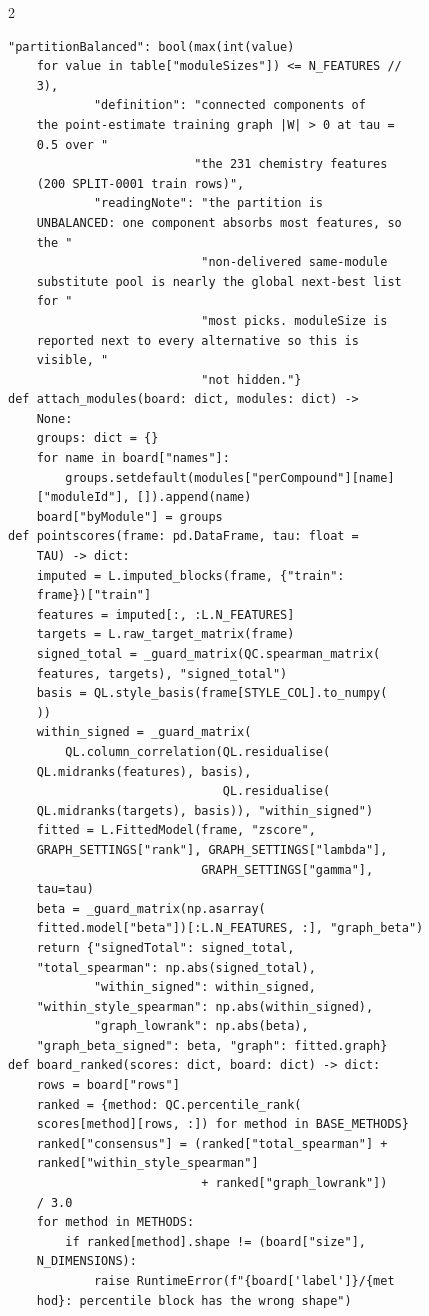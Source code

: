 \begin{multicols}{2}
\begin{Verbatim}[fontsize=\scriptsize]
            "partitionBalanced": bool(max(int(value)
    for value in table["moduleSizes"]) <= N_FEATURES //
    3),
            "definition": "connected components of
    the point-estimate training graph |W| > 0 at tau =
    0.5 over "
                          "the 231 chemistry features
    (200 SPLIT-0001 train rows)",
            "readingNote": "the partition is
    UNBALANCED: one component absorbs most features, so
    the "
                           "non-delivered same-module
    substitute pool is nearly the global next-best list
    for "
                           "most picks. moduleSize is
    reported next to every alternative so this is
    visible, "
                           "not hidden."}
def attach_modules(board: dict, modules: dict) ->
    None:
    groups: dict = {}
    for name in board["names"]:
        groups.setdefault(modules["perCompound"][name]
    ["moduleId"], []).append(name)
    board["byModule"] = groups
def pointscores(frame: pd.DataFrame, tau: float =
    TAU) -> dict:
    imputed = L.imputed_blocks(frame, {"train":
    frame})["train"]
    features = imputed[:, :L.N_FEATURES]
    targets = L.raw_target_matrix(frame)
    signed_total = _guard_matrix(QC.spearman_matrix(
    features, targets), "signed_total")
    basis = QL.style_basis(frame[STYLE_COL].to_numpy(
    ))
    within_signed = _guard_matrix(
        QL.column_correlation(QL.residualise(
    QL.midranks(features), basis),
                              QL.residualise(
    QL.midranks(targets), basis)), "within_signed")
    fitted = L.FittedModel(frame, "zscore",
    GRAPH_SETTINGS["rank"], GRAPH_SETTINGS["lambda"],
                           GRAPH_SETTINGS["gamma"],
    tau=tau)
    beta = _guard_matrix(np.asarray(
    fitted.model["beta"])[:L.N_FEATURES, :], "graph_beta")
    return {"signedTotal": signed_total,
    "total_spearman": np.abs(signed_total),
            "within_signed": within_signed,
    "within_style_spearman": np.abs(within_signed),
            "graph_lowrank": np.abs(beta),
    "graph_beta_signed": beta, "graph": fitted.graph}
def board_ranked(scores: dict, board: dict) -> dict:
    rows = board["rows"]
    ranked = {method: QC.percentile_rank(
    scores[method][rows, :]) for method in BASE_METHODS}
    ranked["consensus"] = (ranked["total_spearman"] +
    ranked["within_style_spearman"]
                           + ranked["graph_lowrank"])
    / 3.0
    for method in METHODS:
        if ranked[method].shape != (board["size"],
    N_DIMENSIONS):
            raise RuntimeError(f"{board['label']}/{met
    hod}: percentile block has the wrong shape")

\end{Verbatim}
\end{multicols}
